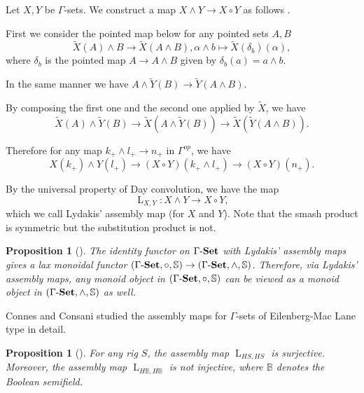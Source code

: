 \documentclass{article}
\numberwithin{equation}{section}
\newtheorem{prop}[thm]{Proposition}
\theoremstyle{definition}
\begin{document}
Let $X, Y$ be $\Gamma$-sets.
We construct a map $X\wedge Y\to X\circ Y$ as follows \cite{Lydakis}.

First we consider the pointed map below for any pointed sets $A, B$
\[\tilde{X}(A)\wedge B\to \tilde{X}(A\wedge B), \alpha\wedge b\mapsto \tilde{X}(\delta_b)(\alpha),\]
where $\delta_b$ is the pointed map $A\to A\wedge B$ given by $\delta_b(a)=a\wedge b$.

In the same manner we have $A\wedge\tilde{Y}(B)\to \tilde{Y}(A\wedge B)$.

By composing the first one and the second one applied by $\tilde{X}$, we have
\[\tilde{X}(A)\wedge \tilde{Y}(B)\to \tilde{X}(A\wedge \tilde{Y}(B))\to \tilde{X}(\tilde{Y}(A\wedge B)).\]

Therefore for any map $k_+\wedge l_+\to n_+$ in $\Gamma^{op}$, we have
\[X(k_+)\wedge Y(l_+)\to (X\circ Y)(k_+\wedge l_+)\to (X\circ Y)(n_+).\]

By the universal property of Day convolution, we have the map
\[\operatorname{L}_{X, Y}:X\wedge Y\to X\circ Y,\]
which we call Lydakis' assembly map (for $X$ and $Y$).
Note that the smash product is symmetric but the substitution product is not.

\begin{prop}[\cite{CC}]The identity functor on $\Gamma \mathchar`-\mathbf{Set}$ with Lydakis' assembly maps gives a lax monoidal functor $(\Gamma \mathchar`-\mathbf{Set}, \circ, \mathbb{S}) \to (\Gamma \mathchar`-\mathbf{Set}, \wedge, \mathbb{S})$.
Therefore, via Lydakis' assembly maps, any monoid object in $(\Gamma \mathchar`-\mathbf{Set}, \circ, \mathbb{S})$ can be viewed as a monoid object in $(\Gamma \mathchar`-\mathbf{Set}, \wedge, \mathbb{S})$ as well.
\end{prop}

Connes and Consani studied the assembly maps for $\Gamma$-sets of Eilenberg-Mac Lane type in detail.
\begin{prop}[\cite{CC}]For any rig $S$, the assembly map $\operatorname{L}_{HS, HS}$ is surjective.
Moreover, the assembly map $\operatorname{L}_{H\mathbb{B}, H\mathbb{B}}$ is not injective, where $\mathbb{B}$ denotes the Boolean semifield.
\end{prop}
\end{document}
